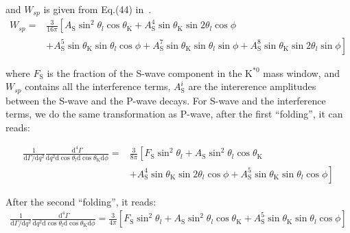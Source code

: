 and $W_{sp}$ is given from Eq.(44) in~\cite{Genon:Swave}. 
\begin{equation} \label{eq:S-wave1}
    \begin{split}
      W_{sp}= &\frac{3}{16 \pi}\left[ A_\mathrm{S}\sin^2\theta_l\cos\theta_\mathrm{K}+ A_\mathrm{S}^4\sin\theta_\mathrm{K}\sin2\theta_l\cos\phi\right.\\
            &+\left.A^5_\mathrm{S}\sin\theta_\mathrm{K}\sin\theta_l\cos\phi+A_\mathrm{S}^7\sin\theta_\mathrm{K}\sin\theta_l\sin\phi+A_\mathrm{S}^8\sin\theta_\mathrm{K}\sin2\theta_l\sin\phi\right]
    \end{split}
\end{equation}

where $F_\mathrm{S}$ is the fraction of the S-wave component in the
$\text{K}^{*0}$ mass window, and $W_{sp}$ contains all the
interference terms, $A_\mathrm{S}^i$ are the intererence amplitudes between the
S-wave and the P-wave decays\cite{Genon:Swave}. For S-wave and the
interference terms, we do the same transformation as P-wave, after the
first ``folding'', it can reads:

\begin{equation} \label{eq:S-fold1}
    \begin{split}
        \frac{1}{\mathrm{d}\Gamma/\mathrm{d}q^2}\frac{\mathrm{d}^4\Gamma}{\mathrm{d}q^2 \mathrm{d}\cos\theta_l \mathrm{d}\cos\theta_\mathrm{K} \mathrm{d}\phi} =&\frac{3}{8\pi}\left[F_\mathrm{S}\sin^2\theta_l+ A_\mathrm{S}\sin^2\theta_l\cos\theta_\mathrm{K}\right.\\
            &+\left. A_\mathrm{S}^4\sin\theta_\mathrm{K}\sin2\theta_l\cos\phi + A^5_\mathrm{S}\sin\theta_\mathrm{K}\sin\theta_l\cos\phi\right]
    \end{split}
\end{equation}

After the second ``folding'', it reads:
\begin{equation} \label{eq:S-fold2}
    \begin{split}
        \frac{1}{\mathrm{d}\Gamma/\mathrm{d}q^2}\frac{\mathrm{d}^4\Gamma}{\mathrm{d}q^2 \mathrm{d}\cos\theta_l \mathrm{d}\cos\theta_\mathrm{K} \mathrm{d}\phi} =\frac{3}{4\pi}\left[F_\mathrm{S}\sin^2\theta_l+A_\mathrm{S}\sin^2\theta_l\cos\theta_\mathrm{K}+A^5_\mathrm{S}\sin\theta_\mathrm{K}\sin\theta_l\cos\phi\right]
    \end{split}
\end{equation}



